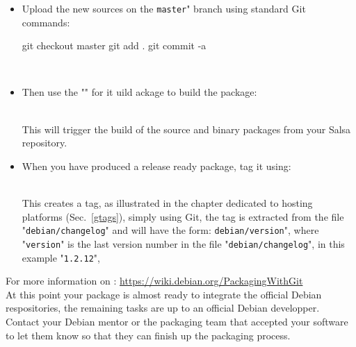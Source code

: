 \begin{itemize}
\item Upload the new sources on the \texttt{master}" branch using standard Git commands: 
\begin{scripti}
 git checkout master
 git add .
 git commit -a
\end{scripti}
\\[-1.25cm]
\item Then use the "" for it uild ackage to build the package:
\begin{scripti}
  
\end{scripti}
\\[-0.75cm] This will trigger the build of the source and binary packages from your Salsa repository.
\item When you have produced a release ready package, tag it using:
\begin{scripti}
   
\end{scripti}
\\[-0.75cm]
\noindent This creates a tag, as illustrated in the chapter dedicated to hosting platforms (Sec.~\ref{gtags}), simply using Git, the tag is extracted from the file "\texttt{debian/changelog}" and will have the form: \texttt{debian/version}", where "\texttt{version}" is the last version number in the file "\texttt{debian/changelog}", in this example "\texttt{1.2.12}", 
\end{itemize}
For more information on : \href{https://wiki.debian.org/PackagingWithGit}{https://wiki.debian.org/PackagingWithGit} \\[0.25cm]
At this point your package is almost ready to integrate the official Debian respositories, the remaining tasks are up to an official Debian developper. Contact your Debian mentor or the packaging team that accepted your software to let them know so that they can finish up the packaging process. 
\newpage
